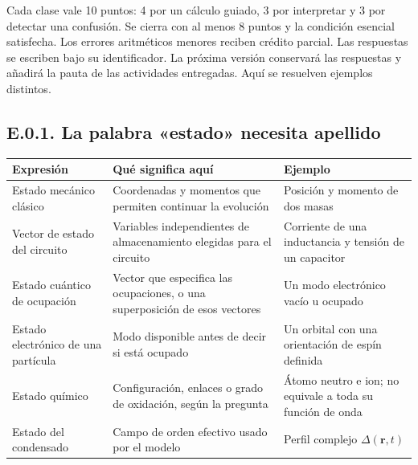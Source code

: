 \documentclass[
  spanish,
  10pt,
  a4paper,
]{article}
\newcounter{none} %
\begin{document}
Cada clase vale 10 puntos: 4 por un cálculo guiado, 3 por interpretar y
3 por detectar una confusión. Se cierra con al menos 8 puntos y la
condición esencial satisfecha. Los errores aritméticos menores reciben
crédito parcial. Las respuestas se escriben bajo su identificador. La
próxima versión conservará las respuestas y añadirá la pauta de las
actividades entregadas. Aquí se resuelven ejemplos distintos.

\subsection{E.0.1. La palabra «estado» necesita
apellido}\label{e.0.1.-la-palabra-estado-necesita-apellido}

{\def\LTcaptype{none} %
\begin{longtable}[]{@{}
  >{\raggedright\arraybackslash}p{}
  >{\raggedright\arraybackslash}p{}
  >{\raggedright\arraybackslash}p{}@{}}
\toprule\noalign{}
\begin{minipage}[b]{\linewidth}\raggedright
Expresión
\end{minipage} & \begin{minipage}[b]{\linewidth}\raggedright
Qué significa aquí
\end{minipage} & \begin{minipage}[b]{\linewidth}\raggedright
Ejemplo
\end{minipage} \\
\midrule\noalign{}
\endhead
\bottomrule\noalign{}
\endlastfoot
Estado mecánico clásico & Coordenadas y momentos que permiten continuar
la evolución & Posición y momento de dos masas \\
Vector de estado del circuito & Variables independientes de
almacenamiento elegidas para el circuito & Corriente de una inductancia
y tensión de un capacitor \\
Estado cuántico de ocupación & Vector que especifica las ocupaciones, o
una superposición de esos vectores & Un modo electrónico vacío u
ocupado \\
Estado electrónico de una partícula & Modo disponible antes de decir si
está ocupado & Un orbital con una orientación de espín definida \\
Estado químico & Configuración, enlaces o grado de oxidación, según la
pregunta & Átomo neutro e ion; no equivale a toda su función de onda \\
Estado del condensado & Campo de orden efectivo usado por el modelo &
Perfil complejo \(\Delta(\mathbf r,t)\) \\
\end{longtable}
}
\end{document}
